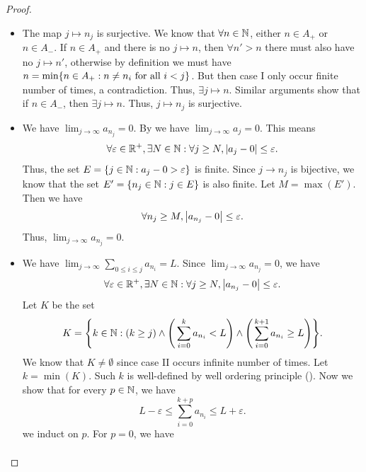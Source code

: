 \begin{proof}
\begin{itemize}
          But this means \(\sum_{n \in A_-} a_n\) is absolutely convergent, a contradiction.
          Thus, case I occurs infinite number of times.
          Similar proof show that case II also occurs infinite number of times.
    \item The map \(j \mapsto n_j\) is surjective.
          We know that \(\forall n \in \mathbb{N}\), either \(n \in A_+\) or \(n \in A_-\).
          If \(n \in A_+\) and there is no \(j \mapsto n\), then \(\forall n' > n\) there must also have no \(j \mapsto n'\), otherwise by definition we must have \(n = \min\set{n \in A_+ : n \neq n_i \text{ for all } i < j}\).
          But then case I only occur finite number of times, a contradiction.
          Thus, \(\exists j \mapsto n\).
          Similar arguments show that if \(n \in A_-\), then \(\exists j \mapsto n\).
          Thus, \(j \mapsto n_j\) is surjective.
    \item We have \(\lim_{j \to \infty} a_{n_j} = 0\).
          By  we have \(\lim_{j \to \infty} a_j = 0\).
          This means
          \[
            \forall \varepsilon \in \mathbb{R}^+, \exists N \in \mathbb{N} : \forall j \geq N, \left\lvert a_j - 0\right\rvert \leq \varepsilon.
          \]
          Thus, the set \(E = \left\lbrace j \in \mathbb{N} : a_j - 0 > \varepsilon\right\rbrace\) is finite.
          Since \(j \to n_j\) is bijective, we know that the set \(E' = \left\lbrace n_j \in \mathbb{N} : j \in E\right\rbrace\) is also finite.
          Let \(M = \max(E')\).
          Then we have
          \[
            \forall n_j \geq M, \left\lvert a_{n_j} - 0\right\rvert \leq \varepsilon.
          \]
          Thus, \(\lim_{j \to \infty} a_{n_j} = 0\).
    \item We have \(\lim_{j \to \infty} \sum_{0 \leq i \leq j} a_{n_i} = L\).
          Since \(\lim_{j \to \infty} a_{n_j} = 0\), we have
          \[
            \forall \varepsilon \in \mathbb{R}^+, \exists N \in \mathbb{N} : \forall j \geq N, \left\lvert a_{n_j} - 0\right\rvert \leq \varepsilon.
          \]
          Let \(K\) be the set
          \[
            K = \set{k \in \N : (k \geq j) \land \Bigg(\sum_{i = 0}^k a_{n_i} < L\Bigg) \land \Bigg(\sum_{i = 0}^{k + 1} a_{n_i} \geq L\Bigg)}.
          \]
          We know that \(K \neq \emptyset\) since case II occurs infinite number of times.
          Let \(k = \min(K)\).
          Such \(k\) is well-defined by well ordering principle ().
          Now we show that for every \(p \in \mathbb{N}\), we have
          \[
            L - \varepsilon \leq \sum_{i = 0}^{k + p} a_{n_i} \leq L + \varepsilon.
          \]
          we induct on \(p\).
          For \(p = 0\), we have
          \begin{align*}

\end{align*}
\end{itemize}
\end{proof}

